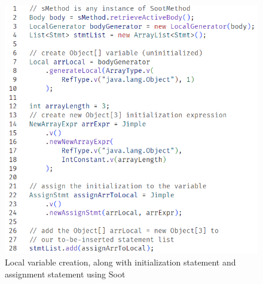 \begin{figure}
    \centering
    \includegraphics{img/apicall_array_create.png}
    \caption{Local variable creation, along with initialization statement and assignment statement using Soot}
    \label{lst:apitracker-array-create}
\end{figure}





